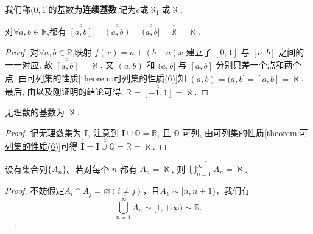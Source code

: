 \documentclass[../../main.tex]{subfiles}%
\begin{document}
\begin{definition}
我们称\((0,1]\)的基数为\textbf{连续基数},记为\(c\)或\(\aleph_1\)或$\aleph$.
\end{definition}

\begin{theorem}
对$\forall a,b\in \mathbb{R}$,都有
$\overline{\overline{[a, b]}} = \overline{\overline{(a, b)}} = \overline{\overline{(a, b]}} = \overline{\overline{\mathbb{R}}} = \aleph$.
\end{theorem}
\begin{proof}

对$\forall a,b\in \mathbb{R}$,映射 $f(x) = a + (b - a)x$ 建立了 $[0, 1]$ 与 $[a, b]$ 之间的一一对应, 故 $\overline{\overline{[a, b]}} = \aleph$. 又 $(a, b)$ 和 $(a, b]$ 与 $[a, b]$ 分别只差一个点和两个点, 由\hyperref[theorem:可列集的性质]{可列集的性质\ref{theorem:可列集的性质(6)}}知 $\overline{\overline{(a, b)}} = \overline{\overline{(a, b]}} = \overline{\overline{[a, b]}} = \aleph$. 最后, 由以及刚证明的结论可得, $\overline{\overline{\mathbb{R}}} = \overline{\overline{[-1, 1]}} = \aleph$.

\end{proof}

\begin{corollary}
无理数的基数为 $\aleph$.
\end{corollary}
\begin{proof}

记无理数集为 $\mathbf{I}$, 注意到 $\mathbf{I} \cup \mathbb{Q} = \mathbb{R}$, 且 $\mathbb{Q}$ 可列, 由\hyperref[theorem:可列集的性质]{可列集的性质\ref{theorem:可列集的性质(6)}}可得 $\overline{\overline{\mathbf{I}}} = \overline{\overline{\mathbf{I} \cup \mathbb{Q}}} = \overline{\overline{\mathbb{R}}} = \aleph$. 

\end{proof}

\begin{theorem}\label{theorem:无穷多个集列的并的势}
设有集合列\(\{A_n\}\)。若对每个 $n$ 都有 $\overline{\overline{A_n}} = \aleph$, 则 $\overline{\overline{\bigcup_{n = 1}^{\infty} A_n}} = \aleph$.
\end{theorem}
\begin{proof}

不妨假定\(A_i\cap A_j=\varnothing(i\neq j)\)，且\(A_k\sim[n,n + 1)\)，我们有
\[\bigcup_{n = 1}^{\infty}A_n\sim[1,+\infty)\sim\mathbb{R}.\]

\end{proof}
\end{document}
